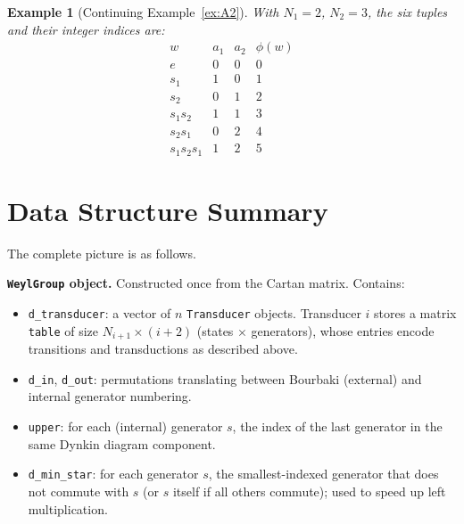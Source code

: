 \documentclass[12pt]{amsart}
\newtheorem{example}[theorem]{Example}
\begin{document}
\begin{example}[Continuing Example~\ref{ex:A2}]
With $N_1 = 2$, $N_2 = 3$, the six tuples and their integer indices are:
\[
\begin{array}{c|cc|c}
w & a_1 & a_2 & \phi(w) \\ \hline
e & 0 & 0 & 0 \\
s_1 & 1 & 0 & 1 \\
s_2 & 0 & 1 & 2 \\
s_1 s_2 & 1 & 1 & 3 \\
s_2 s_1 & 0 & 2 & 4 \\
s_1 s_2 s_1 & 1 & 2 & 5
\end{array}
\]
\end{example}

\section{Data Structure Summary}

The complete picture is as follows.

\textbf{\texttt{WeylGroup} object.}  Constructed once from the Cartan matrix.
Contains:
\begin{itemize}
  \item \texttt{d\_transducer}: a vector of $n$ \texttt{Transducer} objects.
    Transducer $i$ stores a matrix \texttt{table} of size $N_{i+1} \times
    (i+2)$ (states $\times$ generators), whose entries encode transitions and
    transductions as described above.
  \item \texttt{d\_in}, \texttt{d\_out}: permutations translating between
    Bourbaki (external) and internal generator numbering.
  \item \texttt{upper}: for each (internal) generator $s$, the index of the
    last generator in the same Dynkin diagram component.
  \item \texttt{d\_min\_star}: for each generator $s$, the smallest-indexed
    generator that does not commute with $s$ (or $s$ itself if all others
    commute); used to speed up left multiplication.
\end{itemize}
\end{document}
